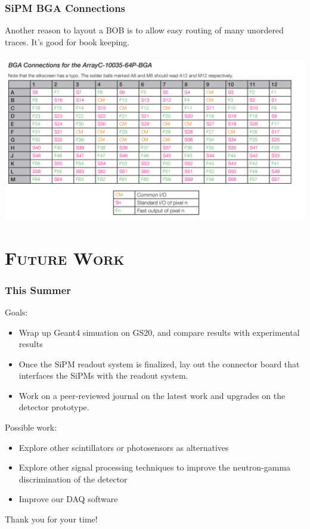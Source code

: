 \documentclass[xcolor=x11names, compress, handout]{beamer}
\renewcommand{\(}{\begin{columns}}
\renewcommand{\)}{\end{columns}}
\newcommand{\<}[1]{\begin{column}{#1}}
\renewcommand{\>}{\end{column}}
\begin{document}
\begin{frame}
  \frametitle{SiPM BGA Connections}
  \scriptsize Another reason to layout a BOB is to allow easy routing of many unordered traces. It's good for book keeping. \\
  \
  \includegraphics[width=\textwidth]{images/SiPM_pinout.png}
\end{frame}

\section{\scshape Future Work}

\begin{frame}[c]
\frametitle{This Summer}
Goals:
  \begin{itemize}
    \item Wrap up Geant4 simuation on GS20, and compare results with experimental results
    \item Once the SiPM readout system is finalized, lay out the connector board that interfaces the SiPMs with the readout system.
    \item Work on a peer-reviewed journal on the latest work and upgrades on the detector prototype.
  \end{itemize}

Possible work:
  \begin{itemize}
    \item Explore other scintillators or photosensors as alternatives
    \item Explore other signal processing techniques to improve the neutron-gamma discrimination of the detector
    \item Improve our DAQ software 
  \end{itemize}
\end{frame}

% 



\begin{frame}
  \vspace{3cm}
  \centering
  Thank you for your time!
  \vspace{3cm}
\end{frame}
\end{document}
